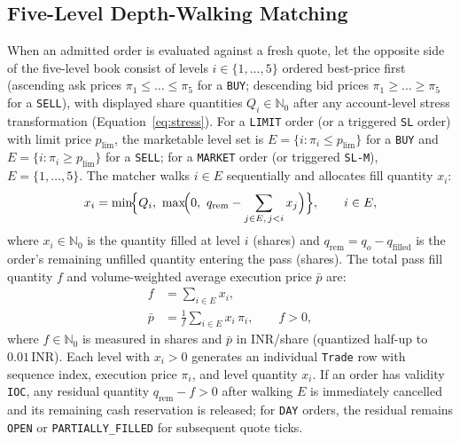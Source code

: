 \documentclass[12pt]{article}
\newcommand{\thinunit}[2]{#1\,\text{#2}}
\begin{document}
\subsection{Five-Level Depth-Walking Matching}
When an admitted order is evaluated against a fresh quote, let the opposite side of the five-level book consist of levels $i\in\{1,\dots,5\}$ ordered best-price first (ascending ask prices $\pi_1 \le \dots \le \pi_5$ for a \texttt{BUY}; descending bid prices $\pi_1 \ge \dots \ge \pi_5$ for a \texttt{SELL}), with displayed share quantities $Q_i \in \mathbb{N}_0$ after any account-level stress transformation (Equation~\eqref{eq:stress}). For a \texttt{LIMIT} order (or a triggered \texttt{SL} order) with limit price $p_{\mathrm{lim}}$, the marketable level set is $E = \{i : \pi_i \le p_{\mathrm{lim}}\}$ for a \texttt{BUY} and $E = \{i : \pi_i \ge p_{\mathrm{lim}}\}$ for a \texttt{SELL}; for a \texttt{MARKET} order (or triggered \texttt{SL-M}), $E = \{1,\dots,5\}$. The matcher walks $i \in E$ sequentially and allocates fill quantity $x_i$:
\begin{equation}
x_i = \min\!\Bigl\{Q_i,\ \max\!\Bigl(0,\ q_{\mathrm{rem}}-\sum_{j\in E,\,j<i}x_j\Bigr)\Bigr\},\qquad i\in E,
\label{eq:alloc}
\end{equation}
where $x_i \in \mathbb{N}_0$ is the quantity filled at level $i$ (shares) and $q_{\mathrm{rem}} = q_o - q_{\mathrm{filled}}$ is the order's remaining unfilled quantity entering the pass (shares). The total pass fill quantity $f$ and volume-weighted average execution price $\bar{p}$ are:
\begin{align}
f &= \sum_{i\in E}x_i, \label{eq:filled}\\
\bar{p} &= \frac{1}{f}\sum_{i\in E}x_i\,\pi_i,\qquad f>0, \label{eq:vwap}
\end{align}
where $f\in\mathbb{N}_0$ is measured in shares and $\bar{p}$ in INR/share (quantized half-up to $\thinunit{0.01}{INR}$). Each level with $x_i > 0$ generates an individual \texttt{Trade} row with sequence index, execution price $\pi_i$, and level quantity $x_i$. If an order has validity \texttt{IOC}, any residual quantity $q_{\mathrm{rem}} - f > 0$ after walking $E$ is immediately cancelled and its remaining cash reservation is released; for \texttt{DAY} orders, the residual remains \texttt{OPEN} or \texttt{PARTIALLY\_FILLED} for subsequent quote ticks.
\end{document}
